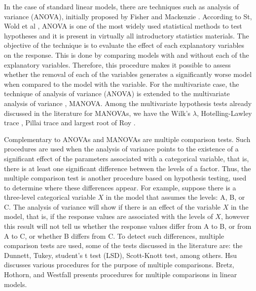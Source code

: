 \documentclass[USenglish]{article}
\theoremstyle{dgthm}
\theoremstyle{dgdef}
\begin{document}

In the case of standard linear models, there are techniques such as analysis of variance (ANOVA), initially proposed by Fisher and Mackenzie \cite{anova_fisher}. According to St, Wold et al \cite{anova1}, ANOVA is one of the most widely used statistical methods to test hypotheses and it is present in virtually all introductory statistics materials. The objective of the technique is to evaluate the effect of each explanatory variables on the response. This is done by comparing models with and without each of the explanatory variables. Therefore, this procedure makes it possible to assess whether the removal of each of the variables generates a significantly worse model when compared to the model with the variable. For the multivariate case, the technique of analysis of variance (ANOVA) is extended to the multivariate analysis of variance \citep{manova}, MANOVA. Among the multivariate hypothesis tests already discussed in the literature for MANOVAs, we have the Wilk's \cite{wilks} $\lambda$, Hotelling-Lawley trace \cite{lawley,hotelling}, Pillai trace \cite{pillai} and largest root of Roy \cite{roy}. 


Complementary to ANOVAs and MANOVAs are multiple comparison tests. Such procedures are used when the analysis of variance points to the existence of a significant effect of the parameters associated with a categorical variable, that is, there is at least one significant difference between the levels of a factor. Thus, the multiple comparison test is another procedure based on hypothesis testing, used to determine where these differences appear. For example, suppose there is a three-level categorical variable $X$ in the model that assumes the levels: A, B, or C. The analysis of variance will show if there is an effect of the variable $X$ in the model, that is, if the response values are associated with the levels of $X$, however this result will not tell us whether the response values differ from A to B, or from A to C, or whether B differs from C. To detect such differences, multiple comparison tests are used, some of the tests discussed in the literature are: the Dunnett, Tukey, student's t test (LSD), Scott-Knott test, among others. Hsu \cite{hsu1996multiple} discusses various procedures for the purpose of multiple comparisons. Bretz, Hothorn, and Westfall \cite{bretz2008multiple} presents procedures for multiple comparisons in linear models.

\end{document}
